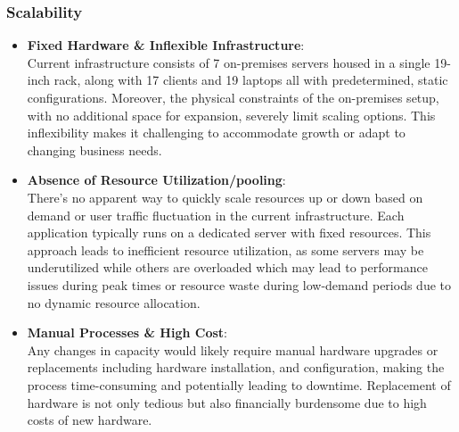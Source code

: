 \documentclass{llncs}
\begin{document}
\subsubsection*{Scalability}
\begin{itemize}
    \item \textbf{Fixed Hardware \& Inflexible Infrastructure}:
          \\
          Current infrastructure consists of 7 on-premises servers housed in a single 19-inch rack,
          along with 17 clients and 19 laptops all with predetermined, static configurations.
          Moreover, the physical constraints of the on-premises setup, with no additional space for expansion, severely limit scaling options.
          This inflexibility makes it challenging to accommodate growth or adapt to changing business needs.
          \\
    \item \textbf{Absence of Resource Utilization/pooling}:
          \\
          There's no apparent way to quickly scale resources up or down based on demand or user traffic fluctuation in the current infrastructure.
          Each application typically runs on a dedicated server with fixed resources.
          This approach leads to inefficient resource utilization, as some servers may be underutilized while others are overloaded which may lead to performance issues during peak times or resource waste during low-demand periods due to no dynamic resource allocation.
          \\
    \item \textbf{Manual Processes \& High Cost}:
          \\
          Any changes in capacity would likely require manual hardware upgrades or replacements including hardware installation,
          and configuration, making the process time-consuming and potentially leading to downtime.
          Replacement of hardware is not only tedious but also financially burdensome due to high costs of new hardware.

\end{itemize}
\end{document}

